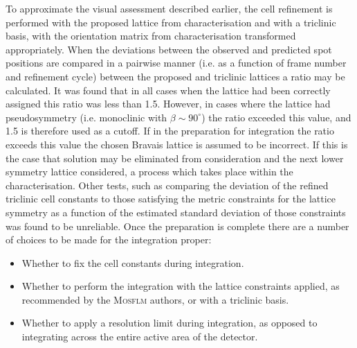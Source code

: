\documentclass[a4paper, 11pt]{article}
\begin{document}
To approximate the visual assessment described earlier, the cell
refinement is performed with the proposed lattice from
characterisation and with a triclinic 
basis, with the orientation matrix from
characterisation transformed appropriately. When the deviations
between the observed and predicted spot positions are compared in a
pairwise manner (i.e. as a function of frame number and refinement
cycle) between the proposed and triclinic lattices
a ratio may be calculated. It was found that in
all cases when the lattice had been correctly assigned this ratio was
less than 1.5. However, in cases where the lattice had pseudosymmetry
(i.e. monoclinic with $\beta \sim 90^{\circ}$)
the ratio exceeded this value, and 1.5 is therefore used as a
cutoff. If in the preparation for integration
the ratio exceeds this value the chosen Bravais lattice
is assumed to be incorrect. If this is the case that solution may be
eliminated from consideration and the next lower symmetry lattice
considered, a process which takes place within the characterisation.
Other tests, such as comparing the deviation of the refined triclinic
cell constants to those satisfying the metric constraints for the 
lattice symmetry as a function
of the estimated standard deviation of those constraints was found to
be unreliable. Once the preparation is complete there are a number of
choices to be made for the integration proper:

\begin{itemize}
\item{Whether to fix the cell constants during integration.}
\item{Whether to perform the integration with the lattice constraints
    applied, as recommended by the \textsc{Mosflm} authors, or with a triclinic
    basis.}
\item{Whether to apply a resolution limit during integration,
    as opposed to integrating across the entire active area of the detector.}
\end{itemize}
\end{document}
